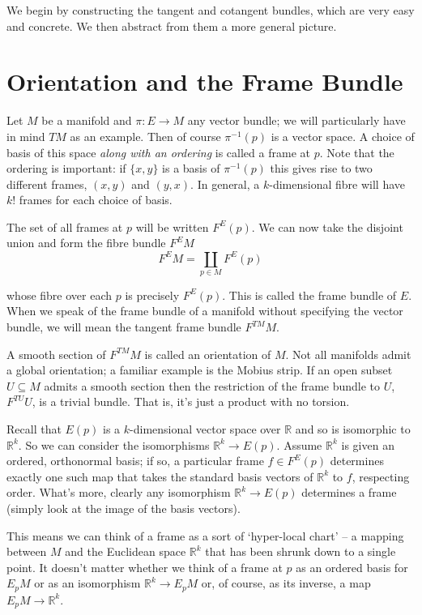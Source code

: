 \documentclass[oneside,english]{amsbook}
\numberwithin{section}{chapter}
\theoremstyle{plain}
\theoremstyle{definition}
\begin{document}
We begin by constructing the tangent and cotangent bundles, which are very easy and concrete. We then abstract from them a more general picture.

\section{Orientation and the Frame Bundle}

Let $M$ be a manifold and $\pi:E\to M$ any vector bundle; we will particularly have in mind $TM$ as an example. Then of course $\pi^{-1}(p)$ is a vector space. A choice of basis of this space \emph{along with an ordering} is called a frame at $p$. Note that the ordering is important: if $\{x, y\}$ is a basis of $\pi^{-1}(p)$ this gives rise to two different frames, $(x, y)$ and $(y, x)$. In general, a $k$-dimensional fibre will have $k!$ frames for each choice of basis.

The set of all frames at $p$ will be written $F^E(p)$. We can now take the disjoint union and form the fibre bundle $F^EM$ 
\[
	F^EM = \coprod_{p\in M}F^E(p)
\]

whose fibre over each $p$ is precisely $F^E(p)$. This is called the frame bundle of $E$. When we speak of the frame bundle of a manifold without specifying the vector bundle, we will mean the tangent frame bundle $F^{TM}M$.

A smooth section of $F^{TM}M$ is called an orientation of $M$. Not all manifolds admit a global orientation; a familiar example is the M\:obius strip. If an open subset $U\subseteq M$ admits a smooth section then the restriction of the frame bundle to $U$, $F^{TU}U$, is a trivial bundle. That is, it's just a product with no torsion.

Recall that $E(p)$ is a $k$-dimensional vector space over $\mathbb{R}$ and so is isomorphic to $\mathbb{R}^k$. So we can consider the isomorphisms $\mathbb{R}^k\to E(p)$. Assume $\mathbb{R}^k$ is given an ordered, orthonormal basis; if so, a particular frame $f\in F^E(p)$ determines exactly one such map that takes the standard basis vectors of $\mathbb{R}^k$ to $f$, respecting order. What's more, clearly any isomorphism $\mathbb{R}^k\to E(p)$ determines a frame (simply look at the image of the basis vectors).

This means we can think of a frame as a sort of `hyper-local chart' -- a mapping between $M$ and the Euclidean space $\mathbb{R}^k$ that has been shrunk down to a single point. It doesn't matter whether we think of a frame at $p$ as an ordered basis for $E_pM$ or as an isomorphism $\mathbb{R}^k\to E_pM$ or, of course, as its inverse, a map $E_pM\to\mathbb{R}^k$. 
\end{document}

